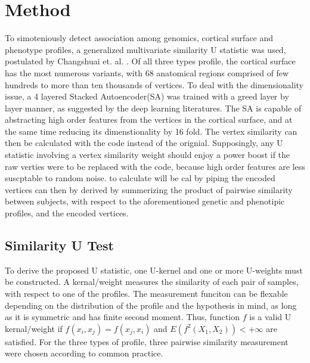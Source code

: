 \section{Method}

To simoteniously detect association among genomics, cortical surface and phenotype profiles, a generalized multivariate similarity U statistic was used, postulated by Changshuai et. al. \cite{HWU}. Of all three types profile, the cortical surface has the most numerous variants, with 68 anatomical regions comprised of few hundreds to more than ten thousands of vertices. To deal with the dimensionality issue, a 4 layered Stacked Autoencoder(SA) was trained with a greed layer by layer manner, as suggested by the deep learning literatures. The SA is capable of abstracting high order features from the vertices in the cortical surface, and at the same time reducing its dimenstionality by 16 fold. 
The vertex similarity can then be calculated with the code instead of the orignial. Supposingly, any U statistic involving a vertex similarity weight should enjoy a power boost if the raw verties were to be replaced with the code, because high order features are less suscptable to random noise. to calculate will be cal by piping the encoded vertices can then by derived by summerizing the product of pairwise similarity between subjects, with respect to the aforementioned genetic and phenotipic profiles, and the encoded vertices. 

\subsection{Similarity U Test}
To derive the proposed U statistic, one U-kernel and one or more U-weights must be constructed. A kernal/weight measures the similarity of each pair of samples, with respect to one of the profiles. The measurement funciton can be flexable depending on the distribution of the profile and the hypothesis in mind, as long as it is symmetric and has finite second moment. Thus, function $f$ is a valid U kernal/weight if $f(x_i,x_j)=f(x_j,x_i)$ and $E(f^2(X_1, X_2))<+\infty$ are satisfied. For the three types of profile, three pairwise similarity measurement were chosen according to common practice.

